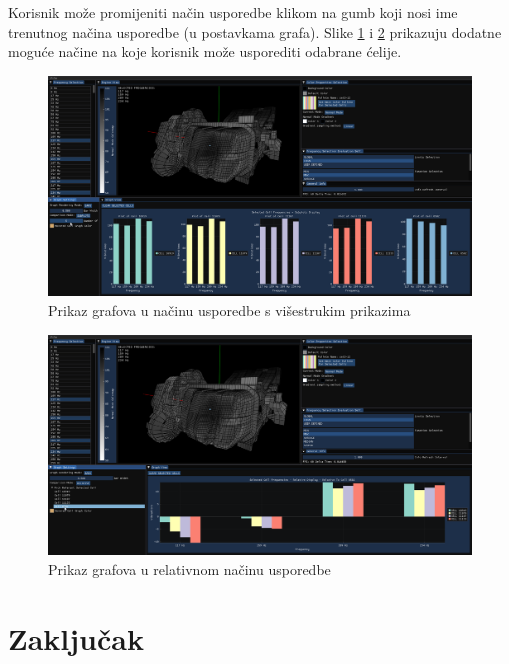\documentclass[times, utf8, diplomski]{fer}
\begin{document}
Korisnik može promijeniti način usporedbe klikom na gumb koji nosi ime trenutnog načina usporedbe (u postavkama grafa). Slike \ref{fig:subplots-graph-comp} i \ref{fig:relative-graph-comp} prikazuju dodatne moguće načine na koje korisnik može usporediti odabrane ćelije.


\begin{figure} [H]
	\centering
    \includegraphics[width=\textwidth]{demonstration/selected_cell_subplots.png}
    \caption{Prikaz grafova u načinu usporedbe s višestrukim prikazima}
    \label{fig:subplots-graph-comp}
\end{figure}

\begin{figure} [H]
	\centering
    \includegraphics[width=\textwidth]{demonstration/selected_cell_relative.png}
    \caption{Prikaz grafova u relativnom načinu usporedbe}
    \label{fig:relative-graph-comp}
\end{figure}

\chapter{Zaključak}
\end{document}
